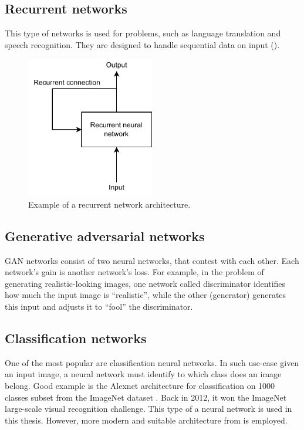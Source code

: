 \subsection{Recurrent networks}

This type of networks is used for problems, such as language translation and speech recognition. They are designed to handle sequential data on input ().

\begin{figure}[!h]
  \centering
  \includegraphics[width=0.5\textwidth]{./fig/photos/recurrent.pdf}

  \caption{Example of a recurrent network architecture.}
  \label{fig:recurrent}
\end{figure}

\subsection{Generative adversarial networks}

GAN networks consist of two neural networks, that contest with each other. Each network's gain is another network's loss. For example, in the problem of generating realistic-looking images, one network called discriminator identifies how much the input image is \enquote{realistic}, while the other (generator) generates this input and adjusts it to \enquote{fool} the discriminator.

\subsection{Classification networks}

One of the most popular are classification neural networks. In such use-case given an input image, a neural network must identify to which class does an image belong. Good example is the Alexnet architecture for classification on 1000 classes subset from the ImageNet dataset \cite{krizhevsky2012imagenet}. Back in 2012, it won the ImageNet large-scale visual recognition challenge. This type of a neural network is used in this thesis. However, more modern and suitable architecture from \cite{giusti2016machine} is employed.

